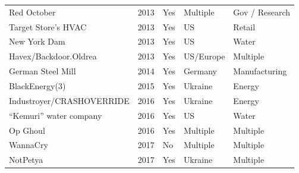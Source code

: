 \documentclass[runningheads]{llncs}
\begin{document}
\begin{table}[h]
\begin{tabular}{|l|l|l|l|l|}
    Red October                     & 2013                                       & Yes                                    & Multiple                                     & Gov / Research                       \\
    Target Store's HVAC             & 2013                                       & Yes                                    & US                                           & Retail                               \\
    New York Dam                    & 2013                                       & Yes                                    & US                                           & Water                               \\
    Havex/Backdoor.Oldrea           & 2013                                       & Yes                                    & US/Europe                                    & Multiple                             \\
    German Steel Mill               & 2014                                       & Yes                                    & Germany                                      & Manufacturing                    \\
    BlackEnergy(3)                  & 2015                                       & Yes                                    & Ukraine                                      & Energy                               \\
    Industroyer/CRASHOVERRIDE       & 2016                                       & Yes                                    & Ukraine                                      & Energy                               \\
    “Kemuri” water company          & 2016                                       & Yes                                    & US                                       & Water                                \\
    Op Ghoul                        & 2016                                       & Yes                                    & Multiple                                     & Multiple                             \\
    WannaCry                        & 2017                                       & No                                     & Multiple                                     & Multiple                             \\
    NotPetya                        & 2017                                       & Yes                                    & Ukraine                              & Multiple                             \\

\end{tabular}
\end{table}
\end{document}
